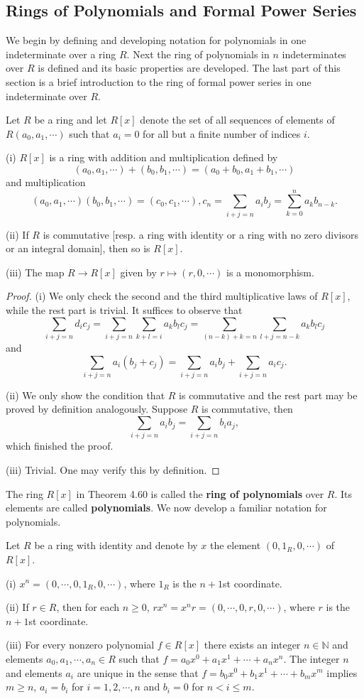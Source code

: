 \subsection{Rings of Polynomials and Formal Power Series}
We begin by defining and developing notation for polynomials in one indeterminate over a ring $R$. Next the ring of polynomials in $n$ indeterminates over $R$ is defined and its basic properties are developed. The last part of this section is a brief introduction to the ring of formal power series in one indeterminate over $R$.
\begin{theorem}
Let $R$ be a ring and let $R[x]$ denote the set of all sequences of elements of $R(a_0,a_1,\cdots)$ such that $a_i=0$ for all but a finite number of indices $i$.\par
(i) $R[x]$ is a ring with addition and multiplication defined by 
$$
\left( a_0,a_1,\cdots \right) +\left( b_0,b_1,\cdots \right) =\left( a_0+b_0,a_1+b_1,\cdots \right) 
$$
and multiplication 
$$
\left( a_0,a_1,\cdots \right) \left( b_0,b_1,\cdots \right) =\left( c_0,c_1,\cdots \right) ,c_n=\sum_{i+j=n}{a_ib_j}=\sum_{k=0}^n{a_kb_{n-k}}.
$$\par
(ii) If $R$ is commutative [resp. a ring with identity or a ring with no zero divisors or an integral domain], then so is $R[x]$.\par
(iii) The map $R\to R[x]$ given by $r\mapsto(r,0,\cdots)$ is a monomorphism.
\end{theorem}
\begin{proof}
(i) We only check the second and the third multiplicative laws of $R[x]$, while the rest part is trivial. It suffices to observe that 
$$
\sum_{i+j=n}{d_ic_j}=\sum_{i+j=n}{\sum_{k+l=i}{a_kb_lc_j}}=\sum_{\left( n-k \right) +k=n}{\sum_{l+j=n-k}{a_kb_lc_j}}
$$
and 
$$
\sum_{i+j=n}{a_i\left( b_j+c_j \right)}=\sum_{i+j=n}{a_ib_j}+\sum_{i+j=n}{a_ic_j}.
$$\par
(ii) We only show the condition that $R$ is commutative and the rest part may be proved by definition analogously. Suppose $R$ is commutative, then 
$$
\sum_{i+j=n}{a_ib_j}=\sum_{i+j=n}{b_ia_j},
$$
which finished the proof.\par
(iii) Trivial. One may verify this by definition.
\end{proof}
The ring $R[x]$ in Theorem 4.60 is called the \textbf{ring of polynomials} over $R$. Its elements are called \textbf{polynomials}. We now develop a familiar notation for polynomials.
\begin{theorem}
Let $R$ be a ring with identity and denote by $x$ the element $(0,1_R,0,\cdots)$ of $R[x]$.\par
(i) $x^n=(0,\cdots,0,1_R,0,\cdots)$, where $1_R$ is the $n+1$st coordinate.\par
(ii) If $r\in R$, then for each $n\ge 0$, $rx^n=x^nr=(0,\cdots,0,r,0,\cdots)$, where $r$ is the $n+1$st coordinate.\par
(iii) For every nonzero polynomial $f\in R[x]$ there exists an integer $n\in\mathbb{N}$ and elements $a_0,a_1,\cdots,a_n\in R$ such that $f=a_0x^0+a_1x^1+\cdots+a_nx^n$. The integer $n$ and elements $a_i$ are unique in the sense that $f=b_0x^0+b_1x^1+\cdots+b_mx^m$ implies $m\ge n$, $a_i=b_i$ for $i=1,2,\cdots,n$ and $b_i=0$ for $n<i\le m$.
\end{theorem}
